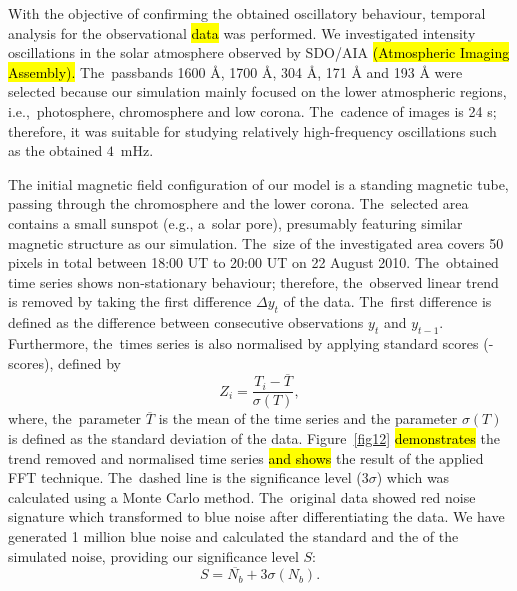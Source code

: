\documentclass[physics,article,accept,pdftex,moreauthors]{Definitions/mdpi}
\begin{document}
With the objective of confirming the obtained oscillatory behaviour, temporal analysis for the observational \hl{data}\cite{Pesnell2012}\cite{Lemen2012} %
was performed. We investigated intensity oscillations in the solar atmosphere observed by 
SDO/AIA  \hl{(Atmospheric Imaging Assembly).} 
The~passbands 1600 {\AA}, 1700 {\AA}, 304 {\AA}, 171 {\AA} and 193 {\AA} were selected because our simulation mainly focused on the lower atmospheric regions, i.e.,~photosphere, chromosphere and low corona. The~cadence of images is 24 s; therefore, it was suitable for studying relatively high-frequency oscillations such as the obtained $4$~mHz.

The initial magnetic field configuration of our model is a standing magnetic tube, passing through the chromosphere and the lower corona. 
The~selected area contains a small sunspot (e.g., a~solar pore), presumably featuring similar magnetic structure as our simulation. The~size 
of the investigated area covers 50 pixels in total between 18:00 UT to 20:00 UT on 22 August 2010. The~obtained time series shows 
non-stationary behaviour; therefore, the~observed linear trend is removed by taking the first difference $\Delta  y_{t}$ of the data. 
The~first difference is defined as the difference between consecutive observations $y_{t}$ and $y_{t-1}$. Furthermore, the~times series is 
also normalised by applying standard scores (-scores), %
defined by 
\begin{equation}
	Z_{i} = \frac {T_{i} - \overline{T}}  {\sigma(T)},
	\label{z_score}
\end{equation}
where, the~parameter $\overline{T}$ is the mean of the time series and the parameter $\sigma(T)$ is defined as the standard deviation of the data. 
Figure~\ref{fig12} %
\hl{demonstrates} the trend removed and normalised time series  %
\hl{and shows} %
the result of the applied FFT technique. The~dashed line is the significance level ($3 \sigma$) which was calculated using a 
Monte Carlo method. The~original data showed red noise signature which transformed to blue noise after differentiating the data. 
We have generated 1 million blue noise  and calculated the standard  
and the 
of the simulated noise, providing our significance level $S$:
\begin{equation}
    S = \overline{N_{b}} + 3 \sigma(N_{b}).
\end{equation}
\end{document}
